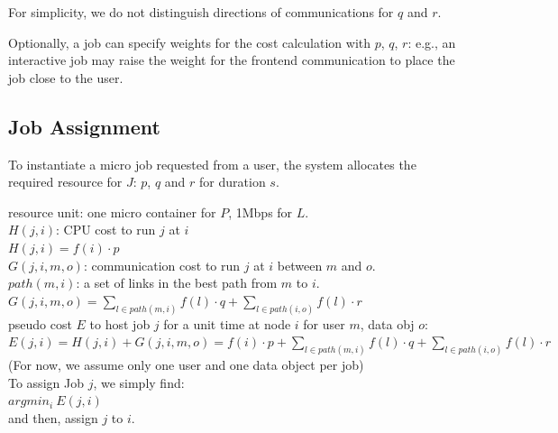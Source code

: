For simplicity, we do not distinguish directions of communications for $q$ and $r$.

Optionally, a job can specify weights for the cost calculation with $p$, $q$, $r$:
e.g., an interactive job may raise the weight for the frontend
communication to place the job close to the user.

\subsection{Job Assignment}

To instantiate a micro job requested from a user, the system allocates
the required resource for $J$: $p$, $q$ and $r$ for duration $s$.



resource unit: one micro container for $P$, 1Mbps for $L$. \\
$H(j, i)$: CPU cost to run $j$ at $i$ \\
\( H(j, i) = f(i) \cdot p \)	\\
$G(j, i, m, o)$: communication cost to run $j$ at $i$ between $m$ and $o$. \\
$path(m,i)$: a set of links in the best path from $m$ to $i$. \\
\( G(j, i, m, o) = \sum_{l \in path(m,i)} f(l) \cdot q + \sum_{l \in path(i,o)} f(l) \cdot r \) \\
pseudo cost $E$ to host job $j$ for a unit time at node $i$ for user $m$, data obj $o$: \\
\( E(j, i)  =  H(j,i) + G(j,i,m,o) =  f(i) \cdot p + \sum_{l \in path(m,i)} f(l) \cdot q + \sum_{l \in path(i,o)} f(l) \cdot r \) \\
(For now, we assume only one user and one data object per job) \\
To assign Job $j$, we simply find: \\
\(  argmin_{i} \: E(j, i)   \)  \\
and then, assign $j$ to $i$. \\

  
